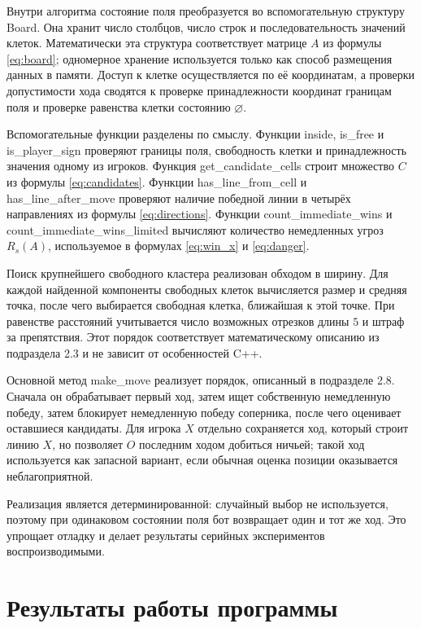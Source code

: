 \documentclass[a4paper,14pt]{extarticle}
\begin{document}
Внутри алгоритма состояние поля преобразуется во вспомогательную структуру Board. Она хранит число столбцов, число строк и последовательность значений клеток. Математически эта структура соответствует матрице $A$ из формулы \eqref{eq:board}; одномерное хранение используется только как способ размещения данных в памяти. Доступ к клетке осуществляется по её координатам, а проверки допустимости хода сводятся к проверке принадлежности координат границам поля и проверке равенства клетки состоянию $\varnothing$.

Вспомогательные функции разделены по смыслу. Функции inside, is\_free и is\_player\_sign проверяют границы поля, свободность клетки и принадлежность значения одному из игроков. Функция get\_candidate\_cells строит множество $C$ из формулы \eqref{eq:candidates}. Функции has\_line\_from\_cell и has\_line\_after\_move проверяют наличие победной линии в четырёх направлениях из формулы \eqref{eq:directions}. Функции count\_immediate\_wins и count\_immediate\_wins\_limited вычисляют количество немедленных угроз $R_s(A)$, используемое в формулах \eqref{eq:win_x} и \eqref{eq:danger}.

Поиск крупнейшего свободного кластера реализован обходом в ширину. Для каждой найденной компоненты свободных клеток вычисляется размер и средняя точка, после чего выбирается свободная клетка, ближайшая к этой точке. При равенстве расстояний учитывается число возможных отрезков длины $5$ и штраф за препятствия. Этот порядок соответствует математическому описанию из подраздела 2.3 и не зависит от особенностей C++.

Основной метод make\_move реализует порядок, описанный в подразделе 2.8. Сначала он обрабатывает первый ход, затем ищет собственную немедленную победу, затем блокирует немедленную победу соперника, после чего оценивает оставшиеся кандидаты. Для игрока $X$ отдельно сохраняется ход, который строит линию $X$, но позволяет $O$ последним ходом добиться ничьей; такой ход используется как запасной вариант, если обычная оценка позиции оказывается неблагоприятной.

Реализация является детерминированной: случайный выбор не используется, поэтому при одинаковом состоянии поля бот возвращает один и тот же ход. Это упрощает отладку и делает результаты серийных экспериментов воспроизводимыми.

\clearpage
\section{Результаты работы программы}
\end{document}
